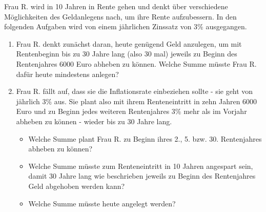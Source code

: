 \begin{Aufgabe}[6] 
	Frau R. wird in 10 Jahren in Rente gehen und denkt über verschiedene Möglichkeiten des Geldanlegens nach, um ihre Rente aufzubessern. In den folgenden Aufgaben wird von einem jährlichen Zinssatz von 3\% ausgegangen.
	\begin{enumerate}
		\item Frau R. denkt zunächst daran, heute genügend Geld anzulegen, um mit Rentenbeginn bis zu 30 Jahre lang (also 30 mal) jeweils zu Beginn des Rentenjahres 6000 Euro abheben zu können. Welche Summe müsste Frau R. dafür heute mindestens anlegen?
		\item Frau R. fällt auf, dass sie die Inflationsrate einbeziehen sollte - sie geht von jährlich 3\% aus. Sie plant also mit ihrem Renteneintritt in zehn Jahren 6000 Euro und zu Beginn jedes weiteren Rentenjahres 3\% mehr als im Vorjahr abheben zu können - wieder bis zu 30 Jahre lang.
		\begin{itemize}
			\item Welche Summe plant Frau R. zu Beginn ihres 2., 5. bzw. 30. Rentenjahres abheben zu können?
			\item Welche Summe müsste zum Renteneintritt in 10 Jahren angespart sein, damit 30 Jahre lang wie beschrieben jeweils zu Beginn des Rentenjahres Geld abgehoben werden kann?
			\item Welche Summe müsste heute angelegt werden?
		\end{itemize}
	
	\end{enumerate}
	






	\ifLoesung
\else
\newpage
\Loesung{}{}
\fi

\end{Aufgabe}

\newpage

\endinput